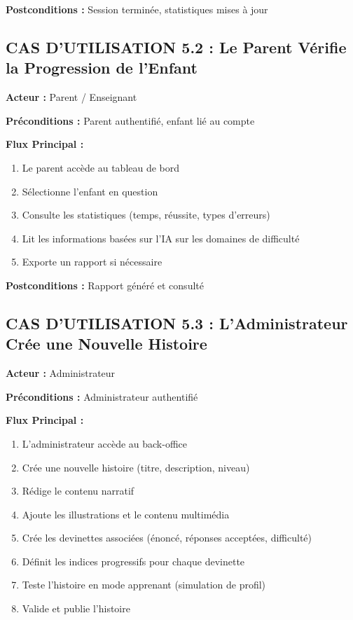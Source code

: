 \documentclass[12pt,a4paper]{article}
\begin{document}
\textbf{Postconditions :} Session terminée, statistiques mises à jour

\subsection{CAS D'UTILISATION 5.2 : Le Parent Vérifie la Progression de l'Enfant}

\textbf{Acteur :} Parent / Enseignant

\textbf{Préconditions :} Parent authentifié, enfant lié au compte

\textbf{Flux Principal :}
\begin{enumerate}
    \item Le parent accède au tableau de bord
    \item Sélectionne l'enfant en question
    \item Consulte les statistiques (temps, réussite, types d'erreurs)
    \item Lit les informations basées sur l'IA sur les domaines de difficulté
    \item Exporte un rapport si nécessaire
\end{enumerate}

\textbf{Postconditions :} Rapport généré et consulté

\subsection{CAS D'UTILISATION 5.3 : L'Administrateur Crée une Nouvelle Histoire}

\textbf{Acteur :} Administrateur

\textbf{Préconditions :} Administrateur authentifié

\textbf{Flux Principal :}
\begin{enumerate}
    \item L'administrateur accède au back-office
    \item Crée une nouvelle histoire (titre, description, niveau)
    \item Rédige le contenu narratif
    \item Ajoute les illustrations et le contenu multimédia
    \item Crée les devinettes associées (énoncé, réponses acceptées, difficulté)
    \item Définit les indices progressifs pour chaque devinette
    \item Teste l'histoire en mode apprenant (simulation de profil)
    \item Valide et publie l'histoire
\end{enumerate}
\end{document}
